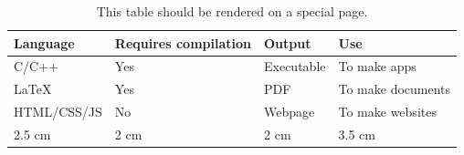 \documentclass{article}
\begin{document}
\newpage
\begin{table}[t]
\centering

\begin{tabular}{|p{2.5cm}|p{2cm}|p{2cm}|p{3.5cm}|}
\hline
\rowcolor{green}
Language & Requires compilation & Output & Use \\
\hline
C/C++ & Yes & Executable & To make apps \\
\hline
\LaTeX & Yes & PDF & To make documents \\
\hline
HTML/CSS/JS & No & Webpage & To make websites \\
\hline
\rowcolor{yellow}
2.5 cm & 2 cm & 2 cm & 3.5 cm \\
\hline
\end{tabular}

\caption{This table should be rendered on a special page.}
\label{mytable}

\end{table}
\end{document}
